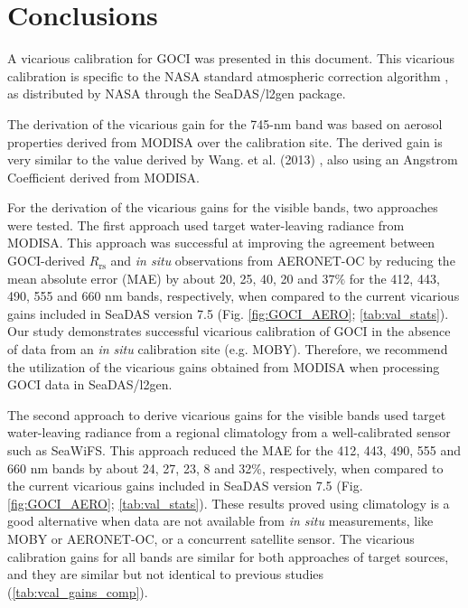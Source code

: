 \documentclass[]{interact}
\theoremstyle{plain}%
\theoremstyle{definition}
\theoremstyle{remark}
\begin{document}
\section{Conclusions}



A vicarious calibration for GOCI was presented in this document. This vicarious calibration is specific to the NASA standard atmospheric correction algorithm \citep{Mobley2016}, as distributed by NASA through the SeaDAS/l2gen package. 

The derivation of the vicarious gain for the 745-nm band was based on aerosol properties derived from MODISA over the calibration site. The derived gain is very similar to the value derived by Wang. et al. (2013) \citep{Wang:13}, also using an Angstrom Coefficient derived from MODISA. 

For the derivation of the vicarious gains for the visible bands, two approaches were tested. The first approach used target water-leaving radiance from MODISA. This approach was successful at improving the agreement between GOCI-derived $R_\text{rs}$ and {\it in situ} observations from AERONET-OC by reducing the mean absolute error (MAE) by about 20, 25, 40, 20 and $37\%$ for the 412, 443, 490, 555 and 660 nm bands, respectively, when compared to the current vicarious gains included in SeaDAS version 7.5 (Fig. \ref{fig:GOCI_AERO}; \autoref{tab:val_stats}). Our study demonstrates successful vicarious calibration of GOCI in the absence of data from an {\it in situ} calibration site (e.g. MOBY). Therefore, we recommend the utilization of the vicarious gains obtained from MODISA when processing GOCI data in SeaDAS/l2gen.

The second approach to derive vicarious gains for the visible bands used target water-leaving radiance from a regional climatology from a well-calibrated sensor such as SeaWiFS. This approach reduced the MAE for the 412, 443, 490, 555 and 660 nm bands by about 24, 27, 23, 8 and 32\%, respectively, when compared to the current vicarious gains included in SeaDAS version 7.5 (Fig. \ref{fig:GOCI_AERO}; \autoref{tab:val_stats}). These results proved using climatology is a good alternative when data are not available from {\it in situ} measurements, like MOBY or AERONET-OC, or a concurrent satellite sensor. The vicarious calibration gains for all bands are similar for both approaches of target sources, and they are similar but not identical to previous studies \citep{Wang:13,Ahn2015} (\autoref{tab:vcal_gains_comp}).
\end{document}
